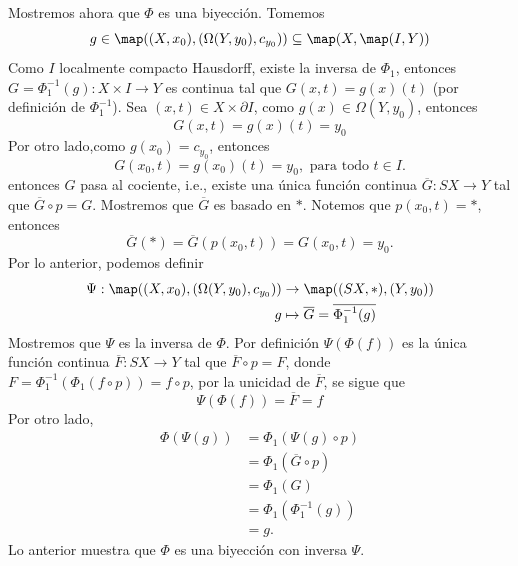\begin{demostracion}
    Mostremos ahora que $\Phi$ es una biyección. Tomemos 
    $$g\in \map((X,x_0),(\Omega(Y,y_0),c_{y_0}))\subseteq \map(X,\map(I, Y))$$
    Como $I$ localmente compacto Hausdorff, existe la inversa de $\Phi_1$, entonces $G=\Phi^{-1}_1(g):X\times I\to Y$ es continua tal que $G(x,t)=g(x)(t)$ (por definición de $\Phi_1^{-1}$). Sea $(x,t)\in X\times \partial I$, como $g(x)\in \Omega(Y,y_0)$, entonces
    \begin{equation*}
        G(x,t)=g(x)(t)=y_0
    \end{equation*}
    Por otro lado,como $g(x_0)=c_{y_0}$, entonces
        \begin{equation*}
        G(x_0,t)=g(x_0)(t)=y_0, \text{ para todo } t\in I.
    \end{equation*}
    entonces $G$ pasa al cociente, i.e., existe una única función continua $\overline{G}:SX\to Y$ tal que $\overline{G}\circ p=G$. Mostremos que $\overline{G}$ es basado en $*$. Notemos que $p(x_0,t)=*$, entonces
    \begin{equation*}
        \overline{G}(*)=\overline{G}(p(x_0,t))=G(x_0,t)=y_0.
    \end{equation*}
    Por lo anterior, podemos definir  
    \begin{align*}
        \Psi:\map((X,x_0),(\Omega(Y,y_0),c_{y_0}))&\to \map((SX,*),(Y,y_0))\\
        g&\mapsto \overline{G}=\overline{\Phi_1^{-1}(g)}
    \end{align*}
    Mostremos que $\Psi$ es la inversa de $\Phi$. Por definición $\Psi(\Phi(f))$ es la única función continua $\overline{F}:SX\to Y$ tal que $\overline{F}\circ p=F$, donde $F=\Phi_1^{-1}(\Phi_1(f\circ p))=f\circ p$, por la unicidad de $\overline{F}$, se sigue que 
    \begin{equation*}
        \Psi(\Phi(f))=\overline{F}=f
    \end{equation*}
    Por otro lado,
    \begin{align*}
        \Phi(\Psi(g))&=\Phi_1(\Psi(g)\circ p)\\
        &=\Phi_1(\overline{G}\circ p)\\
        &=\Phi_1(G)\\
        &=\Phi_1(\Phi_1^{-1}(g))\\
        &=g.
    \end{align*}
    Lo anterior muestra que $\Phi$ es una biyección con inversa $\Psi$.
\end{demostracion}
